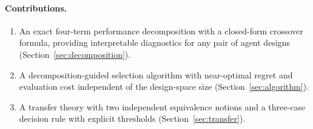 \paragraph{Contributions.}
\begin{enumerate}
\item An exact four-term performance decomposition with a closed-form
  crossover formula, providing interpretable diagnostics for any pair of
  agent designs (Section~\ref{sec:decomposition}).
\item A decomposition-guided selection algorithm with near-optimal regret
  and evaluation cost independent of the design-space size
  (Section~\ref{sec:algorithm}).
\item A transfer theory with two independent equivalence notions and a
  three-case decision rule with explicit thresholds
  (Section~\ref{sec:transfer}).
\end{enumerate}
